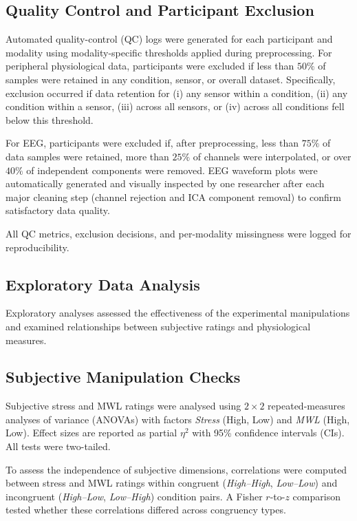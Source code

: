 \documentclass[lettersize,journal]{IEEEtran}
\begin{document}
\subsection{Quality Control and Participant Exclusion}
\label{sec:qc}

Automated quality-control (QC) logs were generated for each participant and modality using modality-specific thresholds applied during preprocessing. For peripheral physiological data, participants were excluded if less than $50\%$ of samples were retained in any condition, sensor, or overall dataset. Specifically, exclusion occurred if data retention for (i) any sensor within a condition, (ii) any condition within a sensor, (iii) across all sensors, or (iv) across all conditions fell below this threshold.

For EEG, participants were excluded if, after preprocessing, less than $75\%$ of data samples were retained, more than $25\%$ of channels were interpolated, or over $40\%$ of independent components were removed. EEG waveform plots were automatically generated and visually inspected by one researcher after each major cleaning step (channel rejection and ICA component removal) to confirm satisfactory data quality.

All QC metrics, exclusion decisions, and per-modality missingness were logged for reproducibility.

\subsection{Exploratory Data Analysis}

Exploratory analyses assessed the effectiveness of the experimental manipulations and examined relationships between subjective ratings and physiological measures.

\subsection{Subjective Manipulation Checks}
Subjective stress and MWL ratings were analysed using $2\times2$ repeated-measures analyses of variance (ANOVAs) with factors \textit{Stress} (High, Low) and \textit{MWL} (High, Low). Effect sizes are reported as partial $\eta^2$ with 95\% confidence intervals (CIs). 
All tests were two-tailed. 

To assess the independence of subjective dimensions, correlations were computed between stress and MWL ratings within congruent (\textit{High–High}, \textit{Low–Low}) and incongruent (\textit{High–Low}, \textit{Low–High}) condition pairs. 
A Fisher \(r\)-to-\(z\) comparison tested whether these correlations differed across congruency types.
\end{document}
